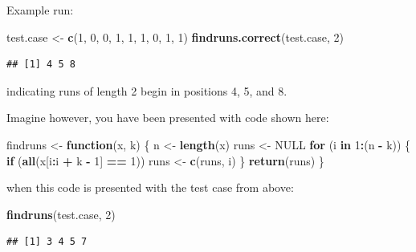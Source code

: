 \documentclass[]{article}
\newenvironment{Shaded}{\begin{snugshade}}{\end{snugshade}}
\newcommand{\KeywordTok}[1]{\textcolor[rgb]{0.13,0.29,0.53}{\textbf{#1}}}
\newcommand{\DecValTok}[1]{\textcolor[rgb]{0.00,0.00,0.81}{#1}}
\newcommand{\StringTok}[1]{\textcolor[rgb]{0.31,0.60,0.02}{#1}}
\newcommand{\OtherTok}[1]{\textcolor[rgb]{0.56,0.35,0.01}{#1}}
\newcommand{\ControlFlowTok}[1]{\textcolor[rgb]{0.13,0.29,0.53}{\textbf{#1}}}
\newcommand{\OperatorTok}[1]{\textcolor[rgb]{0.81,0.36,0.00}{\textbf{#1}}}
\newcommand{\NormalTok}[1]{#1}
\begin{document}
Example run:

\begin{Shaded}
\begin{Highlighting}[]
\NormalTok{test.case <-}\StringTok{ }\KeywordTok{c}\NormalTok{(}\DecValTok{1}\NormalTok{, }\DecValTok{0}\NormalTok{, }\DecValTok{0}\NormalTok{, }\DecValTok{1}\NormalTok{, }\DecValTok{1}\NormalTok{, }\DecValTok{1}\NormalTok{, }\DecValTok{0}\NormalTok{, }\DecValTok{1}\NormalTok{, }\DecValTok{1}\NormalTok{)}
\KeywordTok{findruns.correct}\NormalTok{(test.case, }\DecValTok{2}\NormalTok{)}
\end{Highlighting}
\end{Shaded}

\begin{verbatim}
## [1] 4 5 8
\end{verbatim}

indicating runs of length 2 begin in positions 4, 5, and 8.

Imagine however, you have been presented with code shown here:

\begin{Shaded}
\begin{Highlighting}[]
\NormalTok{findruns <-}\StringTok{ }\ControlFlowTok{function}\NormalTok{(x, k) \{}
\NormalTok{  n <-}\StringTok{ }\KeywordTok{length}\NormalTok{(x)}
\NormalTok{  runs <-}\StringTok{ }\OtherTok{NULL}
  \ControlFlowTok{for}\NormalTok{ (i }\ControlFlowTok{in} \DecValTok{1}\OperatorTok{:}\NormalTok{(n }\OperatorTok{-}\StringTok{ }\NormalTok{k)) \{}
    \ControlFlowTok{if}\NormalTok{ (}\KeywordTok{all}\NormalTok{(x[i}\OperatorTok{:}\NormalTok{i }\OperatorTok{+}\StringTok{ }\NormalTok{k }\OperatorTok{-}\StringTok{ }\DecValTok{1}\NormalTok{] }\OperatorTok{==}\StringTok{ }\DecValTok{1}\NormalTok{)) runs <-}\StringTok{ }\KeywordTok{c}\NormalTok{(runs, i)}
\NormalTok{  \}}
  \KeywordTok{return}\NormalTok{(runs)}
\NormalTok{\}}
\end{Highlighting}
\end{Shaded}

when this code is presented with the test case from above:

\begin{Shaded}
\begin{Highlighting}[]
\KeywordTok{findruns}\NormalTok{(test.case, }\DecValTok{2}\NormalTok{)}
\end{Highlighting}
\end{Shaded}

\begin{verbatim}
## [1] 3 4 5 7
\end{verbatim}
\end{document}
